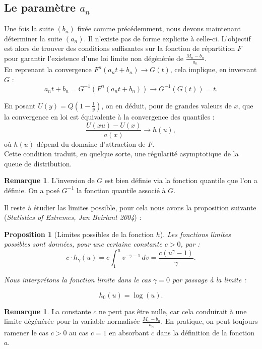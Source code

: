 \documentclass{article}
\theoremstyle{plain}
\theoremstyle{definition}
\newtheorem{remark}[definition]{Remarque}
\theoremstyle{plain}
\newtheorem{proposition}[definition]{Proposition}
\begin{document}
\subsection{Le paramètre $a_n$}
\noindent Une fois la suite $(b_n)$ fixée comme précédemment, nous devons maintenant déterminer la suite $(a_n)$. Il n'existe pas de forme explicite à celle-ci. L’objectif est alors de trouver des
 conditions suffisantes sur la fonction de répartition $F$ pour garantir l’existence d’une loi limite non dégénérée de $\frac{M_n - b_n}{a_n}$.
\\

\noindent En reprenant la convergence  $F^n(a_n t + b_n) \longrightarrow G(t)$, cela implique, en inversant \( G \) :
\[
a_n t + b_n = G^{-1}(F^n(a_n t + b_n)) \longrightarrow G^{-1}(G(t)) = t.
\]

\noindent En posant \( U(y) = Q\left(1 - \frac{1}{y}\right) \), on en déduit, pour de grandes valeurs de \( x \), que la convergence en loi est équivalente à la convergence des quantiles :
\[
\frac{U(xu) - U(x)}{a(x)} \longrightarrow h(u),
\]
où \( h(u) \) dépend du domaine d’attraction de \( F \). \\

\noindent Cette condition traduit, en quelque sorte, une régularité asymptotique de la queue de distribution.


\begin{remark}
	L'inversion de $G$ est bien définie via la fonction quantile que l'on a définie. On a posé $G^{-1}$ la fonction quantile associé à $G$.
\end{remark}

\vspace{0.3cm}
\noindent Il reste à étudier las limites possible, pour cela nous avons la proposition suivante (\textit{Statistics of Extremes, Jan Beirlant 2004}) :
\vspace{0.3cm}
\begin{proposition}[Limites possibles de la fonction $h$]
Les fonctions limites possibles sont données, pour une certaine constante $c > 0$, par :
\[
c \cdot h_\gamma(u) = c \int_1^u v^{-\gamma - 1} \, dv = \frac{c(u^\gamma - 1)}{\gamma}.
\tag{2}
\]

\noindent Nous interprétons la fonction limite dans le cas $\gamma = 0$ par passage à la limite :

\[
h_0(u) = \log(u).
\]
\end{proposition}

\noindent
\begin{remark}
	La constante $c$ ne peut pas être nulle, car cela conduirait à une limite dégénérée pour la variable normalisée $\frac{M_n - b_n}{a_n}$. En pratique, on peut toujours ramener le cas $c > 0$ au cas $c = 1$ en absorbant $c$ dans la définition de la fonction $a$.
\end{remark}
\end{document}
